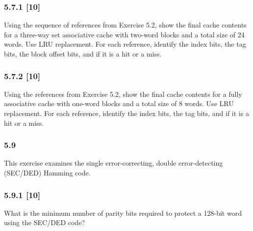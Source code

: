 \documentclass[fleqn]{article}
\begin{document}
\subsubsection*{5.7.1 [10] \textrangle} Using the sequence of references from Exercise 5.2, show the final cache contents for a three-way set associative cache with two-word blocks and a total size of 24 words. Use LRU replacement. For each reference, identify the index bits, the tag bits, the block offset bits, and if it is a hit or a miss.
\subsubsection*{5.7.2 [10] \textrangle} Using the references from Exercise 5.2, show the final cache contents for a fully associative cache with one-word blocks and a total size of 8 words. Use LRU replacement. For each reference, identify the index bits, the tag bits, and if it is a hit or a miss.

\subsubsection*{5.9} This exercise examines the single error-correcting, double error-detecting (SEC/DED) Hamming code.
\subsubsection*{5.9.1 [10] \textrangle} What is the minimum number of parity bits required to protect a 128-bit word using the SEC/DED code?
\end{document}
